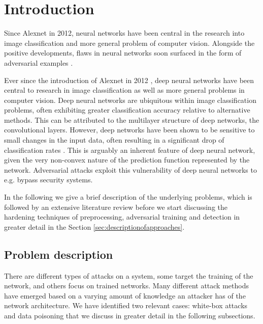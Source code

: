 \section{Introduction}
Since Alexnet in 2012, neural networks have been central in the research into image classification and more general problem of computer vision. Alongside the positive developments, flaws in neural networks soon surfaced in the form of adversarial examples .

Ever since the introduction of Alexnet in 2012 \cite{krizhevsky2012imagenet}, deep neural networks have been central to research in image classification as well as more general problems in computer vision. Deep neural networks are ubiquitous within image classification problems, often exhibiting greater classification accuracy relative to alternative methods. This can be attributed to the multilayer structure of deep networks, the convolutional layers. However, deep networks have been shown to be sensitive to small changes in the input data, often resulting in a significant drop of classification rates \cite{Szegedy13}. This is arguably an inherent feature of deep neural network, given the very non-convex nature of the prediction function represented by the network. Adversarial attacks exploit this vulnerability of deep neural networks to e.g. bypass security systems.

In the following we give a brief description of the underlying problems, which is followed by an extensive literature review before we start discussing the hardening techniques of preprocessing, adversarial training and detection in greater detail in the Section \ref{sec:descriptionofapproaches}.

\subsection{Problem description}

There are different types of attacks on a system, some target the training of the network, and others focus on trained networks. Many different attack methods have emerged based on a varying amount of knowledge an attacker has of the network architecture. We have identified two relevant cases: white-box attacks and data poisoning that we discuss in greater detail in the following subsections. 

